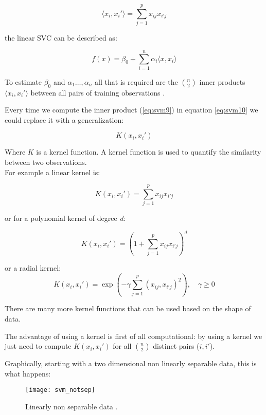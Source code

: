 \begin{equation} \label{eq:svm9}
	\langle x_i, x_i' \rangle = \sum_{j=1}^{p} x_{ij}x_{i'j}
\end{equation}

the linear SVC can be described as:

\begin{equation} \label{eq:svm10}
	f(x) = \beta_0 + \sum_{i=1}^{n} \alpha_i \langle x, x_i \rangle
\end{equation}

To estimate $\beta_{0}$ and $\alpha_1 \dots, \alpha_n$ all that is required are the $n \choose 2$ inner products $\langle x_i, x_i' \rangle$ between all pairs of training observations \cite{ISLR}.

Every time we compute the inner product (\ref{eq:svm9}) in equation \ref{eq:svm10} we could replace it with a generalization:

\begin{equation} \label{eq:svm11}
	K(x_i, x_i')
\end{equation}

Where $K$ is a kernel function. A kernel function is used to quantify the similarity between two observations. \\
For example a linear kernel is:

\begin{equation} \label{eq:svm12}
	K(x_i, x_i') = \sum_{j=1}^{p} x_{ij}x_{i'j}
\end{equation}

or for a polynomial kernel of degree \textit{d}:

\begin{equation} \label{eq:svm13}
	K(x_i, x_i') = (1 + \sum_{j=1}^{p} x_{ij}x_{i'j})^d
\end{equation}

or a radial kernel:
\begin{equation} \label{eq:svm14}
	K(x_i, x_i') = \exp(-\gamma\sum_{j=1}^{p} (x_{ij}, x_{i'j})^2), \quad \gamma \ge 0
\end{equation} 

There are many more kernel functions that can be used based on the shape of data.

The advantage of using a kernel is first of all computational: by using a kernel we just need to compute $K(x_i, x_i')$ for all $n \choose 2$ distinct pairs ($i, i'$).

Graphically, starting with a two dimensional non linearly separable data, this is what happens:
\begin{figure}[H]
	\centering
	\texttt{[image: svm\_notsep]}
	\caption{Linearly non separable data \cite{kernel_trick}.}
\end{figure} 

